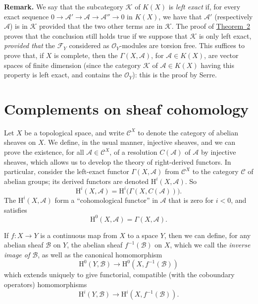 \documentclass{article}
\newenvironment{rmenv}[1]
  {\smallskip\noindent\textbf{#1.}\rmfamily}
  {\smallskip}
\newcommand{\scr}[1]{{\mathscr{#1}}}
\renewcommand{\cal}[1]{{\mathcal{#1}}}
\newcommand{\HH}{\mathrm{H}}
\newcommand{\oldpage}[1]{\marginpar{\footnotesize$\Big\vert$ \textit{p.~#1}}}
\begin{document}
\begin{rmenv}{Remark}
  We say that the subcategory $\cal{K}$ of $K(X)$ is \emph{left exact} if, for every exact sequence $0\to\scr{A}'\to\scr{A}\to\scr{A}''\to0$ in $K(X)$, we have that $\scr{A}'$ (respectively $\scr{A}$) is in $\cal{K}$ provided that the two other terms are in $\cal{K}$.
  The proof of \hyperref[theorem2]{Theorem~2} proves that the conclusion still holds true if we suppose that $\cal{K}$ is only left exact, \emph{provided that} the $\scr{F}_Y$ considered as $\scr{O}_Y$-modules are torsion free.
  This suffices to prove that, if $X$ is complete, then the $\Gamma(X,\scr{A})$, for $\scr{A}\in K(X)$, are vector spaces of finite dimension (since the category $\cal{K}$ of $\scr{A}\in K(X)$ having this property is left exact, and contains the $\scr{O}_Y$): this is the proof by Serre.
\end{rmenv}


\section{Complements on sheaf cohomology}
\label{section3}

Let $X$ be a topological space, and write $\cal{C}^X$ to denote the category of abelian sheaves on $X$.
We define, in the usual manner, injective sheaves, and we can prove the existence, for all $\scr{A}\in\cal{C}^X$, of a resolution $C(\scr{A})$ of $\scr{A}$ by injective sheaves, which allows us to develop the theory of right-derived functors.
In particular, consider the left-exact functor $\Gamma(X,\scr{A})$
\oldpage{2-05}
from $\cal{C}^X$ to the category $\cal{C}$ of abelian groups;
its derived functors are denoted $\HH^i(X,\scr{A})$.
So
\[
  \HH^i(X,\scr{A}) = \HH^i\big(\Gamma(X,C(\scr{A}))\big).
\]
The $\HH^i(X,\scr{A})$ form a ``cohomological functor'' in $\scr{A}$ that is zero for $i<0$, and satisfies
\[
  \HH^0(X,\scr{A}) = \Gamma(X,\scr{A}).
\]

If $f\colon X\to Y$ is a continuous map from $X$ to a space $Y$, then we can define, for any abelian sheaf $\scr{B}$ on $Y$, the abelian sheaf $f^{-1}(\scr{B})$ on $X$, which we call the \emph{inverse image of $\scr{B}$}, as well as the canonical homomorphism
\[
  \HH^0(Y,\scr{B}) \to \HH^0(X,f^{-1}(\scr{B}))
\]
which extends uniquely to give functorial, compatible (with the coboundary operators) homomorphisms
\[
  \HH^i(Y,\scr{B}) \to \HH^i(X,f^{-1}(\scr{B})).
\]
\end{document}
